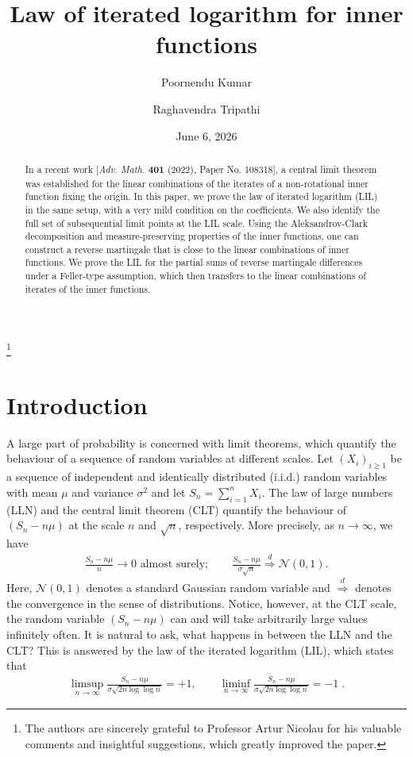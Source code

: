 \documentclass[12pt, reqno, final, a4paper]{amsart}
\title[LIL for inner functions]{Law of iterated logarithm for inner functions}
\author{Poornendu Kumar}
\author{Raghavendra Tripathi}
\date{June 6, 2026}
\theoremstyle{plain}
\theoremstyle{definition}
\theoremstyle{remark}
\newcommand{\1}{\mathbf 1}
\begin{document}
\begin{abstract}
In a recent work [\emph{Adv. Math.} {\bf 401} (2022), Paper No. 108318], a central limit theorem was established for the linear combinations of the iterates of a non-rotational inner function fixing the origin. In this paper, we prove the law of iterated logarithm (LIL) in the same setup, with a very mild condition on the coefficients. We also identify the full set of subsequential limit points at the LIL scale. Using the Aleksandrov-Clark decomposition and measure-preserving properties of the inner functions, one can construct a reverse martingale that is close to the linear combinations of inner functions. We prove the LIL for the partial sums of reverse martingale differences under a Feller-type assumption, which then transfers to the linear combinations of iterates of the inner functions. 
\end{abstract}
\thanks{The authors are sincerely grateful to Professor Artur Nicolau for his valuable comments and insightful suggestions, which greatly improved the paper.}

\maketitle

\section{Introduction}
\label{sec:introduction}
A large part of probability is concerned with limit theorems, which quantify the behaviour of a sequence of random variables at different scales. Let $(X_i)_{i\geq 1}$ be a sequence of independent and identically distributed (i.i.d.) random variables with mean $\mu$ and variance $\sigma^2$ and let $S_n=\sum_{i=1}^{n}X_i$. The law of large numbers (LLN) and the central limit theorem (CLT) quantify the behaviour of $(S_n-n\mu)$ at the scale $n$ and $\sqrt{n}$, respectively. More precisely, as $n\to \infty$, we have
\begin{align*}
    \frac{S_n-n\mu}{n}\to 0 \text{ almost surely}; \qquad 
    \frac{S_n-n\mu}{\sigma\sqrt{n}}\stackrel{d}{\Longrightarrow} \mathcal{N}(0, 1).
\end{align*}
Here, $\mathcal{N}(0, 1)$ denotes a standard Gaussian random variable and $\stackrel{d}{\Longrightarrow}$ denotes the convergence in the sense of distributions. Notice, however, at the CLT scale, the random variable $(S_n-n\mu)$ can and will take arbitrarily large values infinitely often. It is natural to ask, what happens in between the LLN and the CLT? This is answered by the law of the iterated logarithm (LIL), which states that 
\begin{align*}
\limsup_{n\to \infty }\frac{S_n-n\mu}{\sigma \sqrt{2n\log\log n}} =+1, \qquad \liminf_{n\to \infty }\frac{S_n-n\mu}{\sigma \sqrt{2n\log\log n}} =-1\;.
\end{align*}
\end{document}
